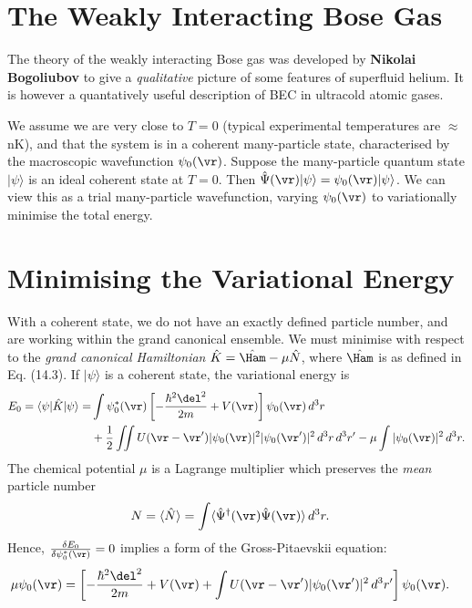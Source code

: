 \documentclass[qo.tex]{subfiles}
\begin{document}
\section{The Weakly Interacting Bose Gas}
The theory of the weakly interacting Bose gas was developed by \textbf{Nikolai Bogoliubov} to give a \emph{qualitative} picture of some features of superfluid helium. 
It is however a quantatively useful description of BEC in ultracold atomic gases. 

We assume we are very close to $T=0$ (typical experimental temperatures are $\approx$ nK), and that the system is in a coherent many-particle state, characterised by the macroscopic wavefunction $\psi_0(\vr)$.
Suppose the many-particle quantum state $|\psi\rangle$ is an ideal coherent state at $T=0$. 
Then $\hat{\Psi}(\vr)|\psi\rangle = \psi_0(\vr)|\psi\rangle$.
We can view this as a trial many-particle wavefunction, varying $\psi_0(\vr)$ to variationally minimise the total energy. 

\section{Minimising the Variational Energy}
With a coherent state, we do not have an exactly defined particle number, and are working within the grand canonical ensemble. 
We must minimise with respect to the \emph{grand canonical Hamiltonian} $\hat{K}=\hat{\Ham}-\mu\hat{N}$, where $\hat{\Ham}$ is as defined in Eq. (14.3).
If $|\psi\rangle$ is a coherent state, the variational energy is
\begin{align}
    \begin{split}
        E_0 = \langle\psi|\hat{K}|\psi\rangle = &\int \psi_0^*(\vr)\left[-\frac{\hbar^2\del^2}{2m}+V(\vr)\right]\psi_0(\vr)\,d^3r \\
                                                &+\frac12 \iint U(\vr-\vr')|\psi_0(\vr)|^2|\psi_0(\vr')|^2\,d^3r\,d^3r' - \mu\int |\psi_0(\vr)|^2\,d^3r.
    \end{split}
\end{align}
The chemical potential $\mu$ is a Lagrange multiplier which preserves the \emph{mean} particle number
\begin{align}
    N &= \langle\hat{N}\rangle = \int \langle\hat{\Psi}^\dagger(\vr)\hat{\Psi}(\vr)\rangle\,d^3r.
\end{align}
Hence, $\frac{\delta E_0}{\delta\psi_0^*(\vr)}=0$ implies a form of the Gross-Pitaevskii equation:
\begin{align}
    \mu\psi_0(\vr) &= \left[-\frac{\hbar^2\del^2}{2m}+V(\vr)+\int U(\vr-\vr')|\psi_0(\vr')|^2\,d^3r'\right]\psi_0(\vr).
\end{align}
\end{document}
